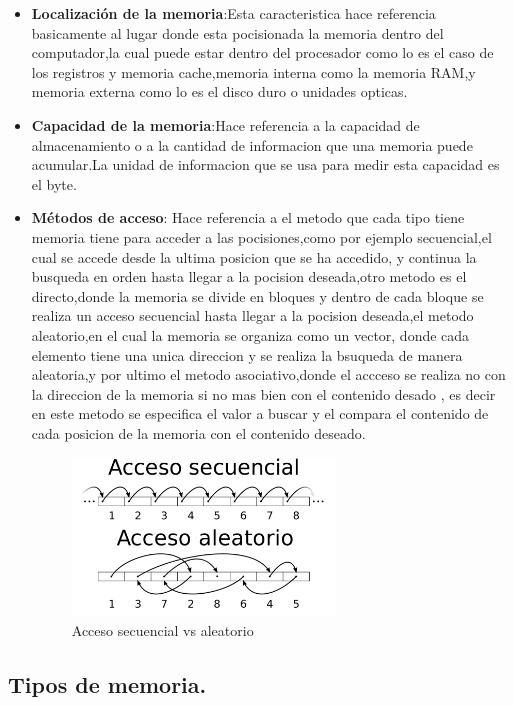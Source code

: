 \documentclass{article}
\begin{document}
\begin{itemize}
    \item \textbf{Localización de la memoria}:Esta caracteristica hace referencia basicamente al lugar donde esta pocisionada la memoria dentro del computador,la cual puede estar dentro del procesador como lo es el caso de los registros y memoria cache,memoria interna como la memoria RAM,y memoria externa como lo es el disco duro o unidades opticas.
    
    \item \textbf{Capacidad de la memoria}:Hace referencia a la capacidad de almacenamiento o a la cantidad de informacion que una memoria puede acumular.La unidad de informacion que se usa para medir esta capacidad es el byte.
    
    \item \textbf {Métodos de acceso}: Hace referencia a el metodo que cada tipo tiene memoria tiene para acceder a las pocisiones,como por ejemplo secuencial,el cual se accede desde la ultima posicion que se ha accedido, y continua la busqueda en orden hasta llegar a la pocision deseada,otro metodo es el directo,donde la memoria se divide en bloques y dentro de cada bloque se realiza un acceso secuencial hasta llegar a la pocision deseada,el metodo aleatorio,en el cual la memoria se organiza como un vector, donde cada elemento tiene una unica direccion y se realiza la bsuqueda de manera aleatoria,y por ultimo el metodo asociativo,donde el accceso se realiza no con la direccion de la memoria si no mas bien con el contenido desado , es decir en este metodo se especifica el valor a buscar y el compara el contenido de cada posicion de la memoria con el contenido deseado. 
    \begin{figure}[h]
    \includegraphics[width=7cm]{accesos.png}
    \centering
    \caption{Acceso secuencial vs aleatorio}
    \label{vs2}
    \end{figure}
    \end{itemize}

\subsection{Tipos de memoria.} \label{tipos}%
\end{document}
